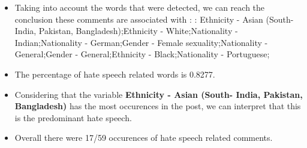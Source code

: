 \documentclass[11pt]{article}
\begin{document}
\begin{itemize}\item Taking into account the words that were detected, we can reach the conclusion these comments are associated with : : Ethnicity - Asian (South- India, Pakistan, Bangladesh);Ethnicity - White;Nationality - Indian;Nationality - German;Gender - Female sexuality;Nationality - General;Gender - General;Ethnicity - Black;Nationality - Portuguese;%

\item The percentage of hate speech related words is 0.8277.

\item Considering that the variable \textbf{Ethnicity - Asian (South- India, Pakistan, Bangladesh)} has the most occurences in the post, we can interpret that this is the predominant hate speech.

\item Overall there were 17/59 occurences of hate speech related comments.\end{itemize}
\end{document}

